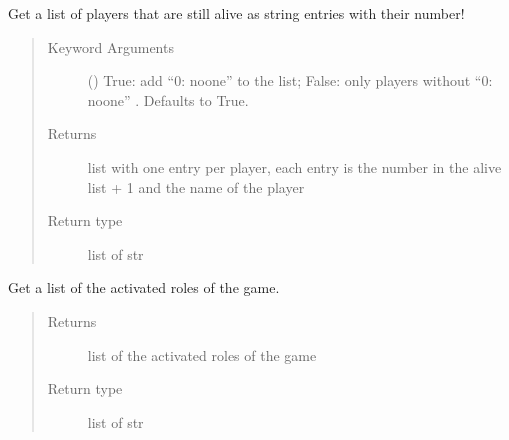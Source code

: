 \documentclass[letterpaper,10pt,english]{sphinxmanual}
\begin{document}
\begin{fulllineitems}
\begin{fulllineitems}
\begin{quote}
\begin{description}
\end{description}\end{quote}

\end{fulllineitems}


\begin{fulllineitems}
\label{\detokenize{chatwolf:chatwolf.game.Game.get_alive_string}}
Get a list of players that are still alive as string entries with their number!
\begin{quote}\begin{description}
\item[{Keyword Arguments}] \leavevmode
{} (\sphinxstyleliteralemphasis{\sphinxupquote{, }}) \textendash{} True: add “0: noone” to the list; False: only players without “0: noone”  . Defaults to True.

\item[{Returns}] \leavevmode
list with one entry per player, each entry is the number in the alive list + 1 and the name of the player

\item[{Return type}] \leavevmode
list of str

\end{description}\end{quote}

\end{fulllineitems}


\begin{fulllineitems}
\label{\detokenize{chatwolf:chatwolf.game.Game.get_num_roles}}
Get a list of the activated roles of the game.
\begin{quote}\begin{description}
\item[{Returns}] \leavevmode
list of the activated roles of the game

\item[{Return type}] \leavevmode
list of str


\end{description}
\end{quote}
\end{fulllineitems}
\end{fulllineitems}
\end{document}
